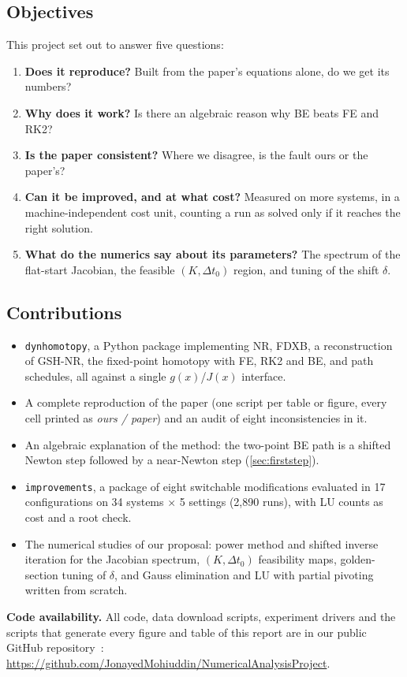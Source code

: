 \documentclass[sigconf,nonacm]{acmart}
\newcommand{\code}[1]{\texttt{#1}}
\newcommand{\repo}{\url{https://github.com/JonayedMohiuddin/NumericalAnalysisProject}}
\begin{document}
\subsection{Objectives}
This project set out to answer five questions:
\begin{enumerate}
  \item[\textbf{Q1.}] \textbf{Does it reproduce?} Built from the paper's equations alone, do we get its numbers?
  \item[\textbf{Q2.}] \textbf{Why does it work?} Is there an algebraic reason why BE beats FE and RK2?
  \item[\textbf{Q3.}] \textbf{Is the paper consistent?} Where we disagree, is the fault ours or the paper's?
  \item[\textbf{Q4.}] \textbf{Can it be improved, and at what cost?} Measured on more systems, in a
        machine-independent cost unit, counting a run as solved only if it reaches the right solution.
  \item[\textbf{Q5.}] \textbf{What do the numerics say about its parameters?} The spectrum of the
        flat-start Jacobian, the feasible $(K,\Delta t_0)$ region, and tuning of the shift $\delta$.
\end{enumerate}

\subsection{Contributions}
\begin{itemize}
  \item \code{dynhomotopy}, a Python package implementing NR, FDXB, a reconstruction of GSH-NR, the
        fixed-point homotopy with FE, RK2 and BE, and path schedules, all against a single
        $g(x)$/$J(x)$ interface.
  \item A complete reproduction of the paper (one script per table or figure, every cell printed as
        \emph{ours / paper}) and an audit of eight inconsistencies in it.
  \item An algebraic explanation of the method: the two-point BE path is a shifted Newton step followed by
        a near-Newton step (\cref{sec:firststep}).
  \item \code{improvements}, a package of eight switchable modifications evaluated in 17 configurations on
        34 systems $\times$ 5 settings (2{,}890 runs), with LU counts as cost and a root check.
  \item The numerical studies of our proposal: power method and shifted inverse iteration for the
        Jacobian spectrum, $(K,\Delta t_0)$ feasibility maps, golden-section tuning of $\delta$, and Gauss
        elimination and LU with partial pivoting written from scratch.
\end{itemize}
\noindent\textbf{Code availability.} All code, data download scripts, experiment drivers and the scripts
that generate every figure and table of this report are in our public GitHub
repository~\cite{ourrepo}: \repo.
\end{document}
